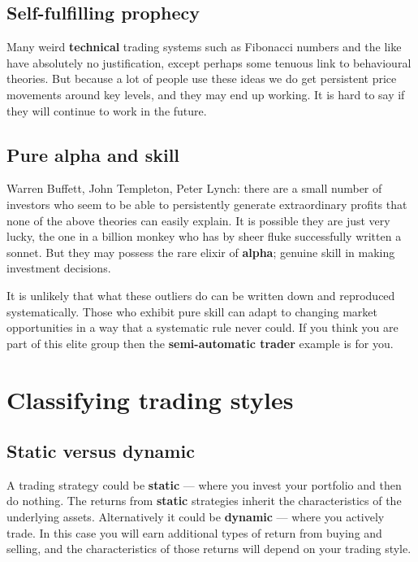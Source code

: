\subsection*{Self-fulfilling prophecy}

Many weird \textbf{technical} trading systems such as Fibonacci numbers and the like have absolutely no justification, except perhaps some tenuous link to behavioural theories. But because a lot of people use these ideas we do get persistent price movements around key levels, and they may end up working. It is hard to say if they will continue to work in the future.

\subsection*{Pure alpha and skill}

Warren Buffett, John Templeton, Peter Lynch: there are a small number of investors who seem to be able to persistently generate extraordinary profits that none of the above theories can easily explain. It is possible they are just very lucky, the one in a billion monkey who has by sheer fluke successfully written a sonnet. But they may possess the rare elixir of \textbf{alpha}; genuine skill in making investment decisions.

It is unlikely that what these outliers do can be written down and reproduced systematically. Those who exhibit pure skill can adapt to changing market opportunities in a way that a systematic rule never could. If you think you are part of this elite group then the \textbf{semi-automatic trader} example is for you.

\section*{Classifying trading styles}  {}


\subsection*{Static versus dynamic}

A trading strategy could be \textbf{static} --- where you invest your portfolio and then do nothing. The returns from \textbf{static} strategies inherit the characteristics of the underlying assets. Alternatively it could be \textbf{dynamic} --- where you actively trade. In this case you will earn additional types of return from buying and selling, and the characteristics of those returns will depend on your trading style.

